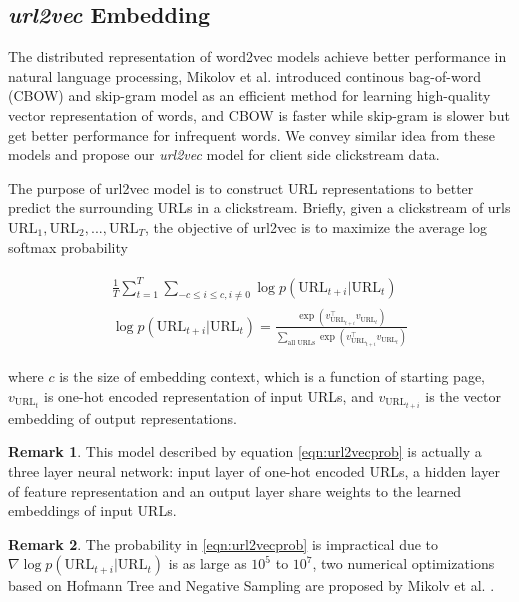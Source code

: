 \subsection{\emph{url2vec} Embedding}

The distributed representation of word2vec models achieve better performance 
in natural language processing,
Mikolov et al. \cite{DBLP:journals/corr/abs-1301-3781} introduced 
continous bag-of-word (CBOW) and skip-gram model as an efficient method for learning high-quality
vector representation of words, and CBOW is faster while skip-gram is slower but get better
performance for infrequent words. We convey similar idea from these models and propose our
\emph{url2vec} model for client side clickstream data.

The purpose of url2vec model is to construct URL representations to better predict 
the surrounding URLs in a clickstream. Briefly, given a clickstream of urls 
$\text{URL}_1, \text{URL}_2, ..., \text{URL}_T$, the objective of url2vec is to maximize the average
log softmax probability

\begin{align}
\label{eqn:url2vecprob}
\begin{split}
    \frac{1}{T}\sum^{T}_{t=1}\sum_{-c \leq i \leq c, i \neq 0} {\log{p(\text{URL}_{t+i} | \text{URL}_t)}}\\
    \log{p(\text{URL}_{t+i} | \text{URL}_t)} = \frac{
        \exp{(v_{\text{URL}_{t+i}} ^\top v_{\text{URL}_t})}
    }{
        \sum_{\text{all URLs}} {\exp{(v_{\text{URL}_{t+i}} ^\top v_{\text{URL}_t})}}
    }
\end{split}
\end{align}

where $c$ is the size of embedding context, which is a function of starting page,
$v_{\text{URL}_t}$ is one-hot encoded representation of input URLs, and 
$v_{\text{URL}_{t+i}}$ is the vector embedding of output representations.

\textbf{Remark 1}. This model described by equation \ref{eqn:url2vecprob} is actually
a three layer neural network: input layer of one-hot encoded URLs, a hidden layer of
feature representation and an output layer share weights to the learned embeddings of 
input URLs.

\textbf{Remark 2}. The probability in \ref{eqn:url2vecprob} is impractical due to
$\nabla \log{p(\text{URL}_{t+i} | \text{URL}_t)}$ is as large as $10^5$ to $10^7$,
two numerical optimizations based on Hofmann Tree and Negative Sampling are proposed 
by Mikolv et al. \cite{mikolv2013embedding}.

